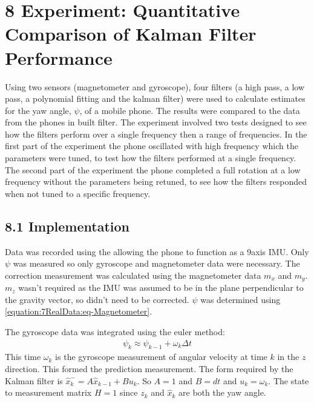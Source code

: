 \documentclass[letterpaper,10pt,english]{jupyterBook}
\begin{document}
\chapter{8 Experiment: Quantitative Comparison of Kalman Filter Performance}
\label{\detokenize{8TestingFilters:experiment-quantitative-comparison-of-kalman-filter-performance}}\label{\detokenize{8TestingFilters::doc}}
\sphinxAtStartPar
Using two sensors (magnetometer and gyroscope), four filters (a high pass, a low pass, a polynomial fitting and the kalman filter) were used to calculate estimates for the yaw angle, \(\psi\), of a mobile phone. The results were compared to the data from the phones in built filter. The experiment involved two tests designed to see how the filters perform over a single frequency then a range of frequencies. In the first part of the experiment the phone oscillated with high frequency which the parameters were tuned, to test how the filters performed at a single frequency. The second part of the experiment the phone completed a full rotation at a low frequency without the parameters being re\sphinxhyphen{}tuned, to see how the filters responded when not tuned to a specific frequency.


\section{8.1 Implementation}
\label{\detokenize{8TestingFilters:implementation}}
\sphinxAtStartPar
Data was recorded using the  allowing the phone to function as a 9\sphinxhyphen{}axis IMU. Only \(\psi\) was measured so only gyroscope and magnetometer data were necessary. The correction measurement was calculated using the magnetometer data \(m_x\) and \(m_y\). \(m_z\) wasn’t required as the IMU was assumed to be in the plane perpendicular to the gravity vector, so didn’t need to be corrected. \(\psi\) was determined using \eqref{equation:7RealData:eq-Magnetometer}.

\sphinxAtStartPar
The gyroscope data was integrated using the euler method:
\begin{equation}\label{equation:8TestingFilters:eq-gyroscope-integration}
\begin{split}\psi_k \approx \psi_{k-1} + \omega_k \Delta t\end{split}
\end{equation}
\sphinxAtStartPar
This time \(\omega_k\) is the gyroscope measurement of angular velocity at time \(k\) in the \(z\) direction. This formed the prediction measurement. The form required by the Kalman filter is \(\hat{x}^-_k = A\hat{x}_{k-1} + Bu_k\). So \(A = 1\) and \(B = dt\) and \(u_k = \omega_k\). The state to measurement matrix \(H = 1\) since \(z_k\) and \(\hat{x}_k\) are both the yaw angle.
\end{document}

